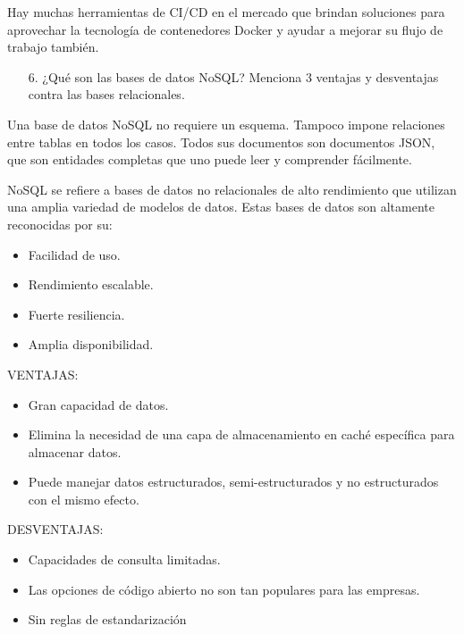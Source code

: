 \documentclass{article}
\begin{document}
Hay muchas herramientas de CI/CD en el mercado que brindan soluciones para aprovechar la tecnología de contenedores Docker y ayudar a mejorar su flujo de trabajo también.    
    
    
\begin{itemize}
    \item[6.]¿Qu\'e son las bases de datos NoSQL? Menciona 3 ventajas y desventajas contra las bases relacionales.
\end{itemize}
Una base de datos NoSQL  no requiere un esquema. Tampoco impone relaciones entre tablas en todos los casos. Todos sus documentos son documentos JSON, que son entidades completas que uno puede leer y comprender fácilmente. 

NoSQL se refiere a bases de datos no relacionales de alto rendimiento que utilizan una amplia variedad de modelos de datos. Estas bases de datos son altamente reconocidas por su: 
\begin{itemize}
    \item Facilidad de uso. 
    \item Rendimiento escalable.
    \item Fuerte resiliencia. 
    \item Amplia disponibilidad. 
\end{itemize}
VENTAJAS:
\begin{itemize}
    \item Gran capacidad de datos.
    \item Elimina la necesidad de una capa de almacenamiento en caché específica para almacenar datos.
    \item Puede manejar datos estructurados, semi-estructurados y no estructurados con el mismo efecto. 
\end{itemize}
DESVENTAJAS:
\begin{itemize}
    \item Capacidades de consulta limitadas.
    \item Las opciones de código abierto no son tan populares para las empresas. 
    \item Sin reglas de estandarización 
\end{itemize}
\end{document}
